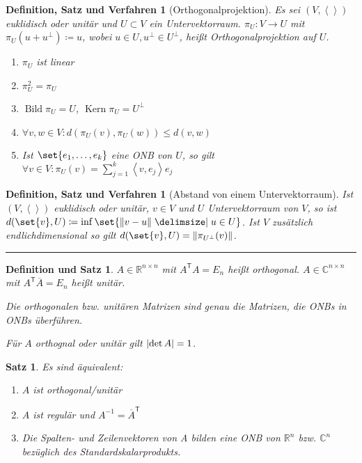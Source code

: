 \documentclass[a4paper]{article}
\newcounter{Sec}
\theoremstyle{marginbreak}
\newtheorem{satz}[definition]{Satz}
\newtheorem{defsatz}[definition]{Definition und Satz}
\newtheorem{defsatzver}[definition]{Definition, Satz und Verfahren}
\DeclareMathOperator{\Kern}{Kern}
\DeclareMathOperator{\Bild}{Bild}
\newcommand{\sep}{%
	\rule{\textwidth}{0.3pt}%
	\stepcounter{Sec}%
	}
\newcommand\conj{\overline}
\newcommand\scp[1]{\left\langle#1\right\rangle}
\newcommand\transpose[1]{#1^{\mathsf{T}}}
\begin{document}
	\begin{defsatzver}[Orthogonalprojektion]
		Es sei $(V, \scp{})$ euklidisch oder unitär und $U\subset V$ ein Untervektorraum.
		$\pi_U\colon V\to U$ mit $\pi_U(u+u^\perp)\coloneqq u$, wobei $u\in U, u^\perp\in U^\perp$, heißt Orthogonalprojektion auf $U$.
		\begin{enumerate}[label=(\alph*)]
			\item $\pi_U$ ist linear
			\item $\pi_U^2 = \pi_U$
			\item $\Bild\pi_U = U$, $\Kern\pi_U = U^\perp$
			\item $\forall v, w\in V\colon d(\pi_U(v), \pi_U(w)) \leq d(v, w)$
			\item Ist $\set{e_1,\ldots,e_k}$ eine ONB von $U$, so gilt $\forall v\in V\colon \pi_U(v)=\sum_{j=1}^k\scp{v, e_j}e_j$
		\end{enumerate}
	\end{defsatzver}
	\begin{defsatzver}[Abstand von einem Untervektorraum]
		Ist $(V, \scp{})$ euklidisch oder unitär, $v\in V$ und $U$ Untervektorraum von $V$, so ist
		$d(\set{v}, U)\coloneqq \inf\set{\norm{v-u}\given u\in U}$. Ist $V$ zusätzlich endlichdimensional
		so gilt $d(\set{v}, U) = \norm{\pi_{U^\perp}(v)}$.
	\end{defsatzver}
	\sep
	\begin{defsatz}
		$A\in\mathbb{R}^{n\times n}$ mit $\transpose{A}A=E_n$ heißt orthogonal.
		$A\in\mathbb{C}^{n\times n}$ mit $\transpose{A}\conj{A}=E_n$ heißt unitär.

		Die orthogonalen bzw. unitären Matrizen sind genau die Matrizen, die ONBs in
		ONBs überführen.

		Für $A$ orthognal oder unitär gilt $\abs{\det A} = 1$.
	\end{defsatz}
	\begin{satz}
		Es sind äquivalent:
		\begin{enumerate}[label=(\alph*)]
			\item $A$ ist orthogonal/unitär
			\item $A$ ist regulär und $A^{-1}=\transpose{\conj{A}}$
			\item Die Spalten- und Zeilenvektoren von A bilden eine ONB von
				$\mathbb{R}^n$ bzw. $\mathbb{C}^n$ bezüglich des Standardskalarprodukts.
		\end{enumerate}
	\end{satz}
\end{document}

